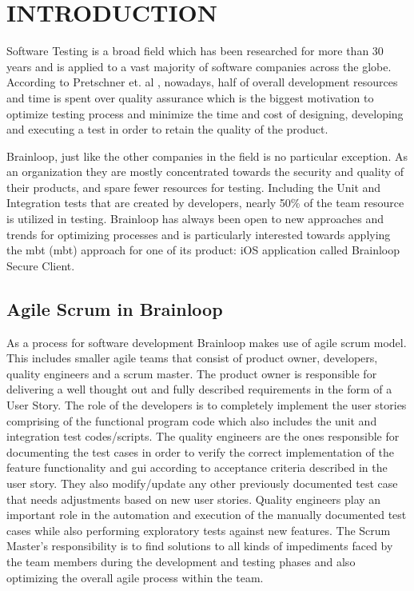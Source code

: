 \chapter{INTRODUCTION}
\label{chapter:introduction}

\par
Software Testing is a broad field which has been researched for more than 30 years and is applied to a vast majority of software companies across the globe. According to Pretschner et. al \cite{Pretschner_MBTInPractice}, nowadays, half of overall development resources and time is spent over quality assurance which is the biggest motivation to optimize testing process and minimize the time and cost of designing, developing and executing a test in order to retain the quality of the product.


\par
Brainloop, just like the other companies in the field is no particular exception. As an organization they are mostly concentrated towards the security and quality of their products, and spare fewer resources for testing. Including the Unit and Integration tests that are created by developers, nearly 50\% of the team resource is utilized in testing. Brainloop has always been open to new approaches and trends for optimizing processes and is particularly interested towards applying the \acrlong{mbt} (\acrshort{mbt}) approach for one of its product: iOS application called Brainloop Secure Client.

\section{Agile Scrum in Brainloop}

\par
As a process for software development Brainloop makes use of agile scrum \cite{Agile_Scrum} model. This includes smaller agile teams that consist of product owner, developers, quality engineers and a scrum master. The product owner is responsible for delivering a well thought out and fully described requirements in the form of a User Story. The role of the developers is to completely implement the user stories comprising of the functional program code which also includes the unit and integration test codes/scripts. The quality engineers are the ones responsible for documenting the test cases in order to verify the correct implementation of the feature functionality and \acrlong{gui} according to acceptance criteria described in the user story. They also modify/update any other previously documented test case that needs adjustments based on new user stories. Quality engineers play an important role in the automation and execution of the manually documented test cases while also performing exploratory tests against new features. The Scrum Master's responsibility is to find solutions to all kinds of impediments faced by the team members during the development and testing phases and also optimizing the overall agile process within the team.

